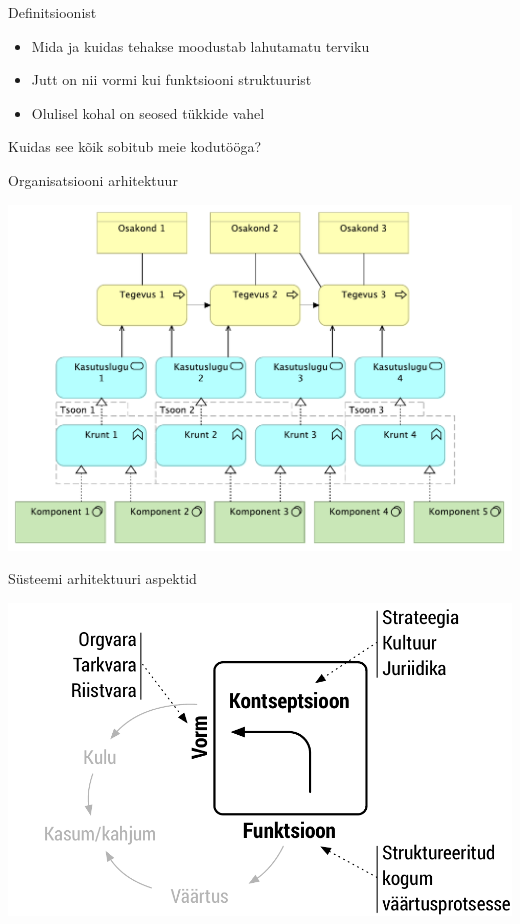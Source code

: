 \documentclass{beamer}
\begin{document}
\begin{frame}{Definitsioonist}
	\begin{itemize}
		\item Mida ja kuidas tehakse moodustab lahutamatu terviku
		\item Jutt on nii vormi kui funktsiooni struktuurist
		\item Olulisel kohal on seosed tükkide vahel
	\end{itemize}
	\begin{center}
		Kuidas see kõik sobitub meie kodutööga?
	\end{center}
\end{frame}

\begin{frame}{Organisatsiooni arhitektuur}
	\begin{center}
		\includegraphics[width=\textwidth]{kihid}
	\end{center}
\end{frame}

\begin{frame}{Süsteemi arhitektuuri aspektid}
	\begin{center}
		\includegraphics[width=.8\textwidth]{orgstruktuur}
	\end{center}
\end{frame}
\end{document}

